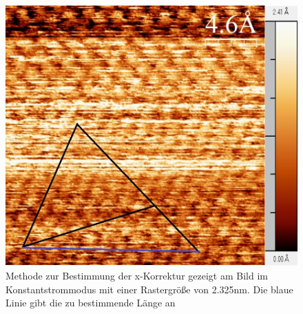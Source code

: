 \documentclass[12pt,a4paper]{article}
\begin{document}
\begin{figure}
\centering
\includegraphics[scale=0.5]{Bilder/Atome/strom2_h_scale.jpg}
\caption{Methode zur Bestimmung der x-Korrektur gezeigt am Bild im Konstantstrommodus mit einer Rastergröße von 2.325nm. Die blaue Linie gibt die zu bestimmende Länge an}
\label{fig:strom2_h}
\end{figure}
\end{document}
